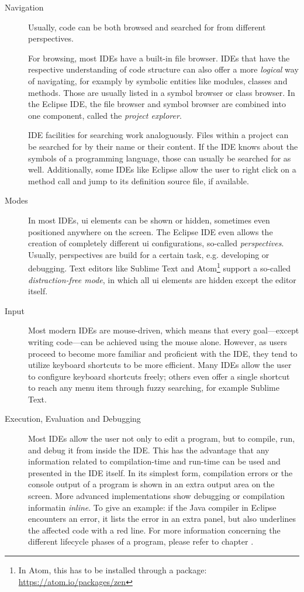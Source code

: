 \begin{description}
\item[Navigation]
Usually, code can be both browsed and searched for from different
perspectives.

For browsing, most IDEs have a built-in file browser. IDEs that have the
respective understanding of code structure can also offer a more
\emph{logical} way of navigating, for examply by symbolic entities like
modules, classes and methods. Those are usually listed in a symbol
browser or class browser. In the Eclipse IDE, the file browser and
symbol browser are combined into one component, called the \emph{project
explorer}.

IDE facilities for searching work analoguously. Files within a project
can be searched for by their name or their content. If the IDE knows
about the symbols of a programming language, those can usually be
searched for as well. Additionally, some IDEs like Eclipse allow the
user to right click on a method call and jump to its definition source
file, if available.
\item[Modes]
In most IDEs, \ac{ui} elements can be shown or hidden, sometimes even
positioned anywhere on the screen. The Eclipse IDE even allows the
creation of completely different \ac{ui} configurations, so-called
\emph{perspectives}. Usually, perspectives are build for a certain task,
e.g. developing or debugging. Text editors like Sublime Text and
Atom\footnote{In Atom, this has to be installed through a package: \url{https://atom.io/packages/zen}}
support a so-called \emph{distraction-free mode}, in which all \acl{ui}
elements are hidden except the editor itself.
\item[Input]
Most modern IDEs are mouse-driven, which means that every goal—except
writing code—can be achieved using the mouse alone. However, as users
proceed to become more familiar and proficient with the IDE, they tend
to utilize keyboard shortcuts to be more efficient. Many IDEs allow the
user to configure keyboard shortcuts freely; others even offer a single
shortcut to reach any menu item through fuzzy searching, for example
Sublime Text.
\item[Execution, Evaluation and Debugging]
Most IDEs allow the user not only to edit a program, but to compile,
run, and debug it from inside the IDE. This has the advantage that any
information related to compilation-time and run-time can be used and
presented in the IDE itself. In its simplest form, compilation errors or
the console output of a program is shown in an extra output area on the
screen. More advanced implementations show debugging or compilation
informatin \emph{inline}. To give an example: if the Java compiler in
Eclipse encounters an error, it lists the error in an extra panel, but
also underlines the affected code with a red line. For more information
concerning the different lifecycle phases of a program, please refer to
chapter .
\end{description}

